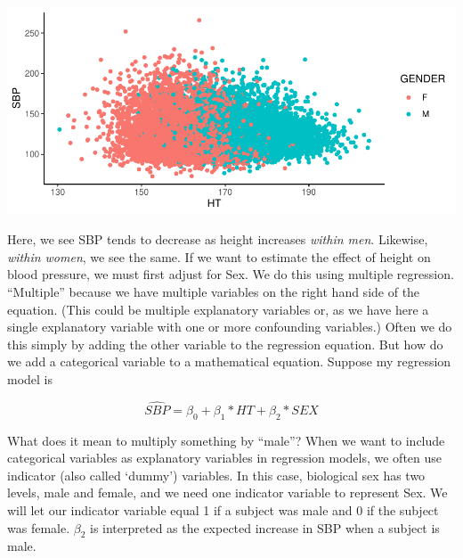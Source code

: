 \documentclass[]{book}
\newenvironment{Shaded}{\begin{snugshade}}{\end{snugshade}}
\newcommand{\DataTypeTok}[1]{\textcolor[rgb]{0.13,0.29,0.53}{#1}}
\newcommand{\KeywordTok}[1]{\textcolor[rgb]{0.13,0.29,0.53}{\textbf{#1}}}
\newcommand{\NormalTok}[1]{#1}
\newcommand{\OperatorTok}[1]{\textcolor[rgb]{0.81,0.36,0.00}{\textbf{#1}}}
\newcommand{\StringTok}[1]{\textcolor[rgb]{0.31,0.60,0.02}{#1}}
\begin{document}
\begin{Shaded}
\end{Shaded}

\includegraphics{MA206supplement_files/figure-latex/unnamed-chunk-5-1.pdf}

Here, we see SBP tends to decrease as height increases \emph{within men}. Likewise, \emph{within women}, we see the same. If we want to estimate the effect of height on blood pressure, we must first adjust for Sex. We do this using multiple regression. ``Multiple'' because we have multiple variables on the right hand side of the equation. (This could be multiple explanatory variables or, as we have here a single explanatory variable with one or more confounding variables.) Often we do this simply by adding the other variable to the regression equation. But how do we add a categorical variable to a mathematical equation. Suppose my regression model is

\[\widehat{SBP}=\beta_0+\beta_1*HT+\beta_2*SEX\]

What does it mean to multiply something by ``male''? When we want to include categorical variables as explanatory variables in regression models, we often use indicator (also called `dummy') variables. In this case, biological sex has two levels, male and female, and we need one indicator variable to represent Sex. We will let our indicator variable equal 1 if a subject was male and 0 if the subject was female. \(\beta_2\) is interpreted as the expected increase in SBP when a subject is male.
\end{document}
